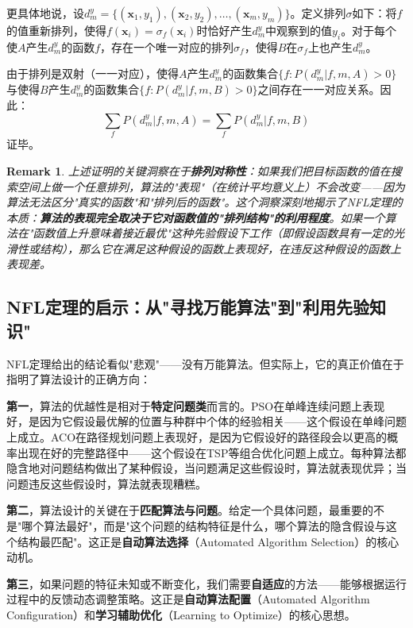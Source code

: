 \documentclass[lang=cn,zihao=-4,a4paper,fontset=windows]{beautybook}
\newtheorem*{remark}{\textbf{Remark}}
\begin{document}
更具体地说，设$d_m^y = \{(\mathbf{x}_1, y_1), (\mathbf{x}_2, y_2), \dots, (\mathbf{x}_m, y_m)\}$。定义排列$\sigma$如下：将$f$的值重新排列，使得$f(\mathbf{x}_i) = \sigma_f(\mathbf{x}_i)$时恰好产生$d_m^y$中观察到的值$y_i$。对于每个使$A$产生$d_m^y$的函数$f$，存在一个唯一对应的排列$\sigma_f$，使得$B$在$\sigma_f$上也产生$d_m^y$。

由于排列是双射（一一对应），使得$A$产生$d_m^y$的函数集合$\{f : P(d_m^y | f, m, A) > 0\}$与使得$B$产生$d_m^y$的函数集合$\{f : P(d_m^y | f, m, B) > 0\}$之间存在一一对应关系。因此：
\[
\sum_{f} P(d_m^y | f, m, A) = \sum_{f} P(d_m^y | f, m, B)
\]
证毕。

\begin{remark}
上述证明的关键洞察在于\textbf{排列对称性}：如果我们把目标函数的值在搜索空间上做一个任意排列，算法的"表现"（在统计平均意义上）不会改变——因为算法无法区分"真实的函数"和"排列后的函数"。这个洞察深刻地揭示了NFL定理的本质：\textbf{算法的表现完全取决于它对函数值的"排列结构"的利用程度}。如果一个算法在"函数值上升意味着接近最优"这种先验假设下工作（即假设函数具有一定的光滑性或结构），那么它在满足这种假设的函数上表现好，在违反这种假设的函数上表现差。
\end{remark}

\subsection{NFL定理的启示：从"寻找万能算法"到"利用先验知识"}

NFL定理给出的结论看似"悲观"——没有万能算法。但实际上，它的真正价值在于指明了算法设计的正确方向：

\textbf{第一}，算法的优越性是相对于\textbf{特定问题类}而言的。PSO在单峰连续问题上表现好，是因为它假设最优解的位置与种群中个体的经验相关——这个假设在单峰问题上成立。ACO在路径规划问题上表现好，是因为它假设好的路径段会以更高的概率出现在好的完整路径中——这个假设在TSP等组合优化问题上成立。每种算法都隐含地对问题结构做出了某种假设，当问题满足这些假设时，算法就表现优异；当问题违反这些假设时，算法就表现糟糕。

\textbf{第二}，算法设计的关键在于\textbf{匹配算法与问题}。给定一个具体问题，最重要的不是"哪个算法最好"，而是"这个问题的结构特征是什么，哪个算法的隐含假设与这个结构最匹配"。这正是\textbf{自动算法选择}（Automated Algorithm Selection）的核心动机。

\textbf{第三}，如果问题的特征未知或不断变化，我们需要\textbf{自适应}的方法——能够根据运行过程中的反馈动态调整策略。这正是\textbf{自动算法配置}（Automated Algorithm Configuration）和\textbf{学习辅助优化}（Learning to Optimize）的核心思想。
\end{document}

